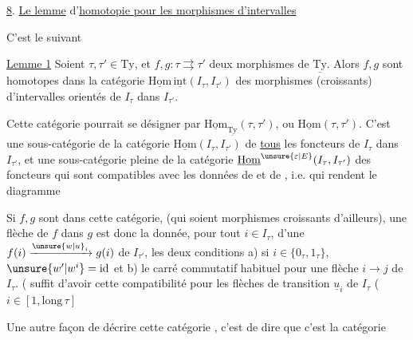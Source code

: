 
\uline{8}. \uline{Le lemme} d'\uline{homotopie pour les morphismes d'intervalles}

C'est le suivant

\uline{Lemme 1} Soient $\tau,\tau'\in\mathrm{Ty}$, et $f,g:\tau\rightrightarrows\tau'$ deux morphismes de $\underline{\mathrm{Ty}}$. Alors $f,g$ sont homotopes dans la catégorie $\underline{\mathrm{Hom}}\,\underline{\mathrm{int}}(I_\tau,I_{\tau'})$ des morphismes (croissants) d'intervalles orientés de $I_\tau$ dans $I_{\tau'}$.

Cette catégorie pourrait  se désigner par $\underline{\mathrm{Hom}}_{\underline{\mathrm{Ty}}}(\tau,\tau')$, ou $\underline{\mathrm{Hom}}(\tau,\tau')$. C'est une sous-catégorie  de la catégorie $\underline{\mathrm{Hom}}(I_\tau,I_{\tau'})$ de \uline{tous} les foncteurs de $I_\tau$ dans $I_{\tau'}$, et une sous-catégorie pleine de la catégorie $\underline{\mathrm{Hom}}^{\unsure{\varepsilon|E}}(I_\tau,I_{\tau'})$ des foncteurs  qui sont compatibles avec les données de  et de , i.e. qui rendent  le diagramme

Si $f,g$  sont dans cette catégorie,  (qui soient morphismes croissants d'ailleurs), une flèche de $f$ dans $g$ est donc  la donnée, pour tout $i\in I_\tau$, d'une   $f(i)\xrightarrow{\unsure{w|u}_i}g(i)$ de $I_{\tau'}$,  les deux conditions a) si $i\in\{0_\tau,1_\tau\}$, $\unsure{w'|w^{i}}=\mathrm{id}$ et b) le carré commutatif habituel pour une flèche $i\to j$ de $I_\tau$. ( suffit d'avoir cette compatibilité pour les flèches de transition $\underline{u}_i$ de $I_\tau$ ($i\in[1,\mathrm{long}\,\tau]$

Une autre façon de décrire cette catégorie , c'est de  dire que c'est  la catégorie 
